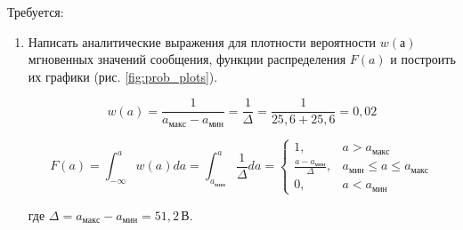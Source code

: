 \documentclass[a4paper, 12pt]{article}
\begin{document}
Требуется:
\begin{enumerate}
  \item Написать аналитические выражения для плотности вероятности 
  $w(а)$ мгновенных значений сообщения, функции распределения $F(a)$ и
  построить их графики (рис. \ref{fig:prob_plots}).

  \begin{equation}
    w(a)=\frac{1}{a_{макс}-a_{мин}}=\frac1\Delta=\frac{1}{25,6+25,6}=0,02 
  \end{equation}

  \begin{equation}
    F(a)=\int^a_{-\infty}w(a)da=
    \int^a_{a_{мин}}\frac{1}{\Delta}da=
    \begin{cases}
      1, & a > a_{макс}\\
      \frac{a-a_{мин}}{\Delta}, & a_{мин} \leq a \leq a_{макс}\\
      0, & a < a_{мин}
    \end{cases}
  \end{equation}

  где $\Delta = a_{макс}-a_{мин}=51,2\, В$.


\end{enumerate}
\end{document}
